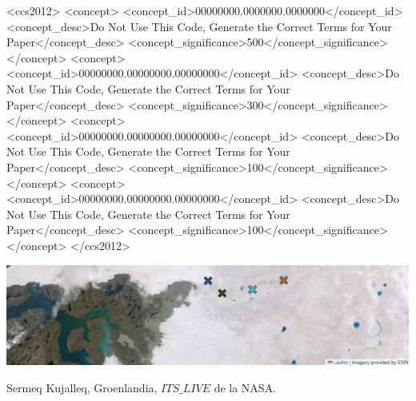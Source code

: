 \documentclass[sigconf,authordraft,language=spanish]{acmart}
\begin{document}
\begin{CCSXML}
<ccs2012>
 <concept>
  <concept_id>00000000.0000000.0000000</concept_id>
  <concept_desc>Do Not Use This Code, Generate the Correct Terms for Your Paper</concept_desc>
  <concept_significance>500</concept_significance>
 </concept>
 <concept>
  <concept_id>00000000.00000000.00000000</concept_id>
  <concept_desc>Do Not Use This Code, Generate the Correct Terms for Your Paper</concept_desc>
  <concept_significance>300</concept_significance>
 </concept>
 <concept>
  <concept_id>00000000.00000000.00000000</concept_id>
  <concept_desc>Do Not Use This Code, Generate the Correct Terms for Your Paper</concept_desc>
  <concept_significance>100</concept_significance>
 </concept>
 <concept>
  <concept_id>00000000.00000000.00000000</concept_id>
  <concept_desc>Do Not Use This Code, Generate the Correct Terms for Your Paper</concept_desc>
  <concept_significance>100</concept_significance>
 </concept>
</ccs2012>
\end{CCSXML}


\begin{teaserfigure}
  \includegraphics[width=\textwidth]{sampleteaser}
  \caption{Sermeq Kujalleq, Groenlandia, $ITS\_LIVE$ de la NASA.}
  \label{fig:teaser}
\end{teaserfigure}
\end{document}
